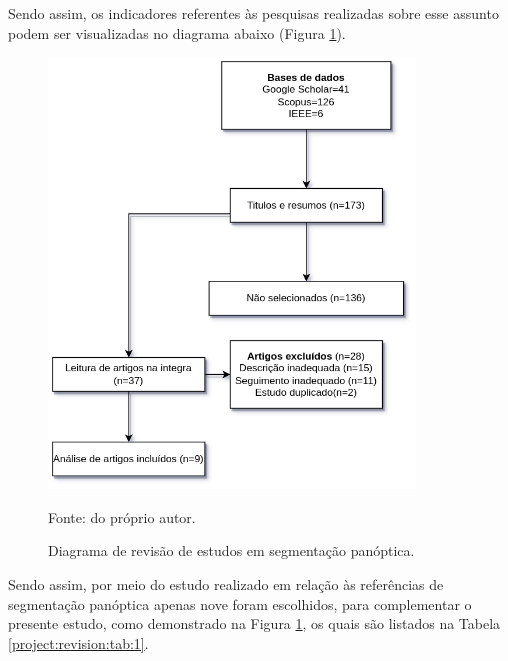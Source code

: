 Sendo assim, os indicadores referentes às pesquisas realizadas sobre esse assunto podem ser visualizadas no diagrama abaixo (Figura \ref{project:revision:fig:1}).

\begin{figure}[H]
    \centering
    \caption{Diagrama de revisão de estudos em segmentação panóptica.}
    \includegraphics[height=4.5in]{recursos/imagens/project/revisao_panoptica.png}
    \label{project:revision:fig:1}

    Fonte: do próprio autor.
\end{figure}

Sendo assim, por meio do estudo realizado em relação às referências de segmentação panóptica apenas nove foram escolhidos, para complementar o presente estudo, como demonstrado na Figura \ref{project:revision:fig:1}, os quais são listados na Tabela \ref{project:revision:tab:1}.

